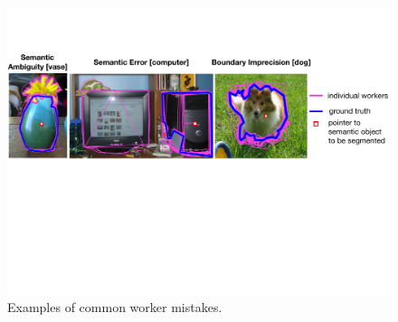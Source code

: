 \begin{figure}[h!]
    \centering
    \includegraphics[width=\linewidth]{plots/errors.pdf}
    \caption{Examples of common worker mistakes.}%
    \label{error_examples}
\end{figure}